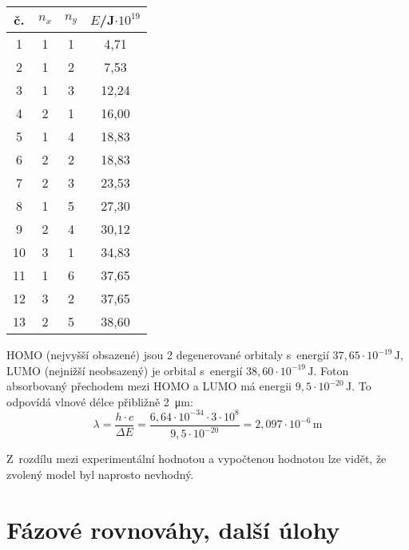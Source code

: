 \documentclass{book}
\begin{document}
\noindent \begin{center}
\begin{tabular}{c|c|c|c}

č. & $n_{x}$ & $n_{y}$ & $E$/J$\cdot10^{19}$\tabularnewline
\hline 
\hline 
1 & 1 & 1 & 4,71\tabularnewline
\hline 
2 & 1 & 2 & 7,53\tabularnewline
\hline 
3 & 1 & 3 & 12,24\tabularnewline
\hline 
4 & 2 & 1 & 16,00\tabularnewline
\hline 
5 & 1 & 4 & 18,83\tabularnewline
\hline 
6 & 2 & 2 & 18,83\tabularnewline
\hline 
7 & 2 & 3 & 23,53\tabularnewline
\hline 
8 & 1 & 5 & 27,30\tabularnewline
\hline 
9 & 2 & 4 & 30,12\tabularnewline
\hline 
10 & 3 & 1 & 34,83\tabularnewline
\hline 
11 & 1 & 6 & 37,65\tabularnewline
\hline 
12 & 3 & 2 & 37,65\tabularnewline
\hline 
13 & 2 & 5 & 38,60\tabularnewline

\end{tabular}
\par\end{center}

HOMO (nejvyšší obsazené) jsou 2 degenerované orbitaly s~energií $37,65\cdot 10^{-19}\, \mathrm{J}$, LUMO (nejnižší neobsazený)
je orbital s~energií $38,60\cdot 10^{-19}\, \mathrm{J}$. Foton absorbovaný přechodem
mezi HOMO a LUMO má energii $9,5\cdot 10^{-20}\, \mathrm{J}$. To odpovídá vlnové délce
přibližně \SI[]{2}{\micro\metre}:
\[
\lambda = \frac{h\cdot c}{\Delta E} = \frac{6,64\cdot 10^{-34}\cdot 3\cdot 10^8 }{9,5 \cdot 10^{-20}} = 2,097 \cdot 10^{-6}\, \si{\metre}
\]

Z~rozdílu mezi experimentální hodnotou a vypočtenou
hodnotou lze vidět, že zvolený model byl naprosto nevhodný. 

\section{Fázové rovnováhy, další úlohy}
\end{document}
